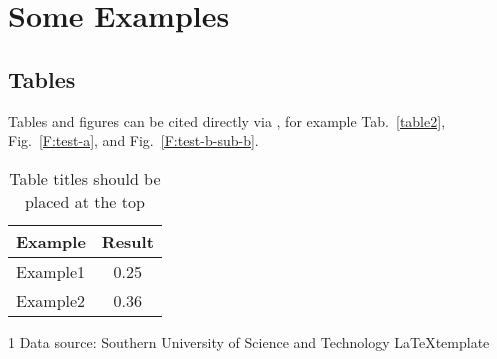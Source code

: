 
\section{Some Examples}

\subsection{Tables}

Tables and figures can be cited directly via \verbbox{\ref{<key>}}, for example Tab.~\ref{table2}, Fig.~\ref{F:test-a}, and Fig.~\ref{F:test-b-sub-b}.

\begin{table}[htb]
    \centering
    \caption{Table titles should be placed at the top}
    \label{table}
    \begin{tabular}{lc} %
        \toprule
        Example & Result \\
        \midrule
        Example1          & 0.25 \\
        Example2          & 0.36 \\
        \bottomrule
    \end{tabular}
\end{table}

\begin{table}[htb]
    \centering
    \caption{Table title with notes}
    \label{table2}
    \begin{threeparttable}
        \begin{tablenotes}
            \item[1] Data source: Southern University of Science and Technology \LaTeX template %
        \end{tablenotes}
    \end{threeparttable}
\end{table}

